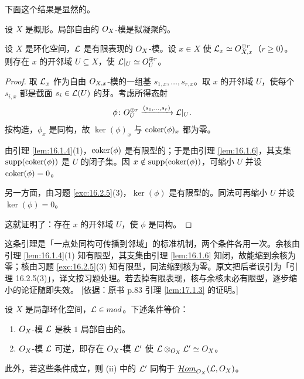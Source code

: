下面这个结果是显然的。

\begin{lemma}\label{lem:17.1.2}
设 $X$ 是概形。局部自由的 $O_X$-模是拟凝聚的。
\end{lemma}

\begin{lemma}\label{lem:17.1.3}
设 $X$ 是环化空间，$\mathcal{L}$ 是有限表现的 $O_X$-模。设 $x\in X$ 使 $\mathcal{L}_x\simeq O_{X,x}^{\oplus r}$（$r\geq 0$）。则存在 $x$ 的开邻域 $U\subseteq X$，使 $\mathcal{L}|_U\simeq O_U^{\oplus r}$。
\end{lemma}

\begin{proof}
取 $\mathcal{L}_x$ 作为自由 $O_{X,x}$-模的一组基 $s_{1,x},\dots,s_{r,x}$。取 $x$ 的开邻域 $U$，使每个 $s_{i,x}$ 都是截面 $s_i\in\mathcal{L}(U)$ 的芽。考虑所得态射
\[
\phi\colon O_U^{\oplus r}\xrightarrow{(s_1,\dots,s_r)}\mathcal{L}|_U.
\]
按构造，$\phi_x$ 是同构，故 $\ker(\phi)_x$ 与 $\operatorname{coker}(\phi)_x$ 都为零。

由引理 \ref{lem:16.1.4}(1)，$\operatorname{coker}(\phi)$ 是有限型的；于是由引理 \ref{lem:16.1.6}，其支集 $\mathrm{supp}(\operatorname{coker}(\phi))$ 是 $U$ 的闭子集。因 $x\notin\mathrm{supp}(\operatorname{coker}(\phi))$，可缩小 $U$ 并设 $\operatorname{coker}(\phi)=0$。

另一方面，由习题 \ref{exc:16.2.5}(3)，$\ker(\phi)$ 是有限型的。同法可再缩小 $U$ 并设 $\ker(\phi)=0$。

这就证明了：存在 $x$ 的开邻域 $U$，使 $\phi$ 是同构。
\end{proof}

\begin{yizhu}
这条引理是「一点处同构可传播到邻域」的标准机制，两个条件各用一次。余核由引理 \ref{lem:16.1.4}(1) 知有限型，其支集由引理 \ref{lem:16.1.6} 知闭，故能缩到余核为零；核由习题 \ref{exc:16.2.5}(3) 知有限型，同法缩到核为零。原文把后者误引为「引理 16.2.5(3)」，译文按习题处理。若去掉有限表现，核与余核未必有限型，逐步缩小的论证随即失效。
[依据：原书 p.83 引理 \ref{lem:17.1.3} 的证明。]
\end{yizhu}

\begin{proposition}\label{prop:17.1.4}
设 $X$ 是局部环化空间，$\mathcal{L}\in mod$。下述条件等价：
\begin{enumerate}[label=(\roman*),leftmargin=2em,itemsep=0.25ex]
\item $O_X$-模 $\mathcal{L}$ 是秩 $1$ 局部自由的。
\item $O_X$-模 $\mathcal{L}$ 可逆，即存在 $O_X$-模 $\mathcal{L}'$ 使 $\mathcal{L}\otimes_{O_X}\mathcal{L}'\simeq O_X$。
\end{enumerate}
此外，若这些条件成立，则 (ii) 中的 $\mathcal{L}'$ 同构于 $\underline{\mathcal{H}om}_{O_X}(\mathcal{L},O_X)$。
\end{proposition}

